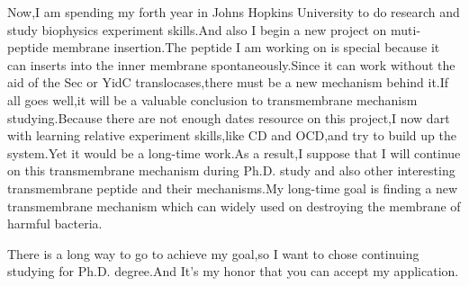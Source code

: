 \documentclass[12pt,a4paper]{article}
\begin{document}
Now,I am spending my forth year in Johns Hopkins University to do research and study biophysics experiment skills.And also I begin a new project on muti-peptide membrane insertion.The peptide I am working on is special because it can inserts into the inner membrane spontaneously.Since it can work without the aid of the Sec or YidC translocases,there must be a new mechanism behind it.If all goes well,it will be a valuable conclusion to transmembrane mechanism studying.Because there are not enough dates resource on this project,I now dart with learning relative experiment skills,like CD and OCD,and try to build up the system.Yet it would be a long-time work.As a result,I suppose that I will continue on this transmembrane mechanism during Ph.D. study and also other interesting transmembrane peptide and their mechanisms.My long-time goal is finding a new transmembrane mechanism which can widely used on destroying the membrane of harmful bacteria.\par
There is a long way to go to achieve my goal,so I want to chose continuing studying for Ph.D. degree.And It's my honor that you can accept my application.
\end{document}
